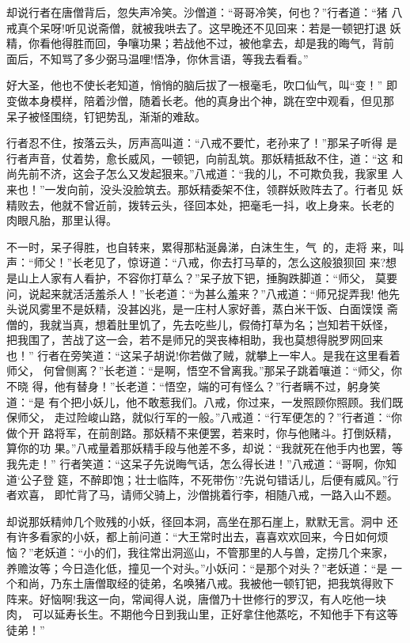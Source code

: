 却说行者在唐僧背后，忽失声冷笑。沙僧道：“哥哥冷笑，何也？”行者道：“猪
八戒真个呆呀!听见说斋僧，就被我哄去了。这早晚还不见回来：若是一顿钯打退
妖精，你看他得胜而回，争嚷功果；若战他不过，被他拿去，却是我的晦气，背前
面后，不知骂了多少弼马温哩!悟净，你休言语，等我去看看。”

好大圣，他也不使长老知道，悄悄的脑后拔了一根毫毛，吹口仙气，叫“变！”
即变做本身模样，陪着沙僧，随着长老。他的真身出个神，跳在空中观看，但见那
呆子被怪围绕，钉钯势乱，渐渐的难敌。

行者忍不住，按落云头，厉声高叫道：“八戒不要忙，老孙来了！”那呆子听得
是行者声音，仗着势，愈长威风，一顿钯，向前乱筑。那妖精抵敌不住，道：“这
和尚先前不济，这会子怎么又发起狠来。”八戒道：“我的儿，不可欺负我，我家里
人来也！”一发向前，没头没脸筑去。那妖精委架不住，领群妖败阵去了。行者见
妖精败去，他就不曾近前，拨转云头，径回本处，把毫毛一抖，收上身来。长老的
肉眼凡胎，那里认得。

不一时，呆子得胜，也自转来，累得那粘涎鼻涕，白沫生生，气的，走将
来，叫声：“师父！”长老见了，惊讶道：“八戒，你去打马草的，怎么这般狼狈回
来?想是山上人家有人看护，不容你打草么？”呆子放下钯，捶胸跌脚道：“师父，
莫要问，说起来就活活羞杀人！”长老道：“为甚么羞来？”八戒道：“师兄捉弄我!
他先头说风雾里不是妖精，没甚凶兆，是一庄村人家好善，蒸白米干饭、白面馍馍
斋僧的，我就当真，想着肚里饥了，先去吃些儿，假倚打草为名；岂知若干妖怪，
把我围了，苦战了这一会，若不是师兄的哭丧棒相助，我也莫想得脱罗网回来也！”
行者在旁笑道：“这呆子胡说!你若做了贼，就攀上一牢人。是我在这里看着师父，
何曾侧离？”长老道：“是啊，悟空不曾离我。”那呆子跳着嚷道：“师父，你不晓
得，他有替身！”长老道：“悟空，端的可有怪么？”行者瞒不过，躬身笑道：“是
有个把小妖儿，他不敢惹我们。八戒，你过来，一发照顾你照顾。我们既保师父，
走过险峻山路，就似行军的一般。”八戒道：“行军便怎的？”行者道：“你做个开
路将军，在前剖路。那妖精不来便罢，若来时，你与他赌斗。打倒妖精，算你的功
果。”八戒量着那妖精手段与他差不多，却说：“我就死在他手内也罢，等我先走！”
行者笑道：“这呆子先说晦气话，怎么得长进！”八戒道：“哥啊，你知道‘公子登
筵，不醉即饱；壮士临阵，不死带伤’?先说句错话儿，后便有威风。”行者欢喜，
即忙背了马，请师父骑上，沙僧挑着行李，相随八戒，一路入山不题。

却说那妖精帅几个败残的小妖，径回本洞，高坐在那石崖上，默默无言。洞中
还有许多看家的小妖，都上前问道：“大王常时出去，喜喜欢欢回来，今日如何烦
恼？”老妖道：“小的们，我往常出洞巡山，不管那里的人与兽，定捞几个来家，
养赡汝等；今日造化低，撞见一个对头。”小妖问：“是那个对头？”老妖道：“是
一个和尚，乃东土唐僧取经的徒弟，名唤猪八戒。我被他一顿钉钯，把我筑得败下
阵来。好恼啊!我这一向，常闻得人说，唐僧乃十世修行的罗汉，有人吃他一块肉，
可以延寿长生。不期他今日到我山里，正好拿住他蒸吃，不知他手下有这等徒弟！”

